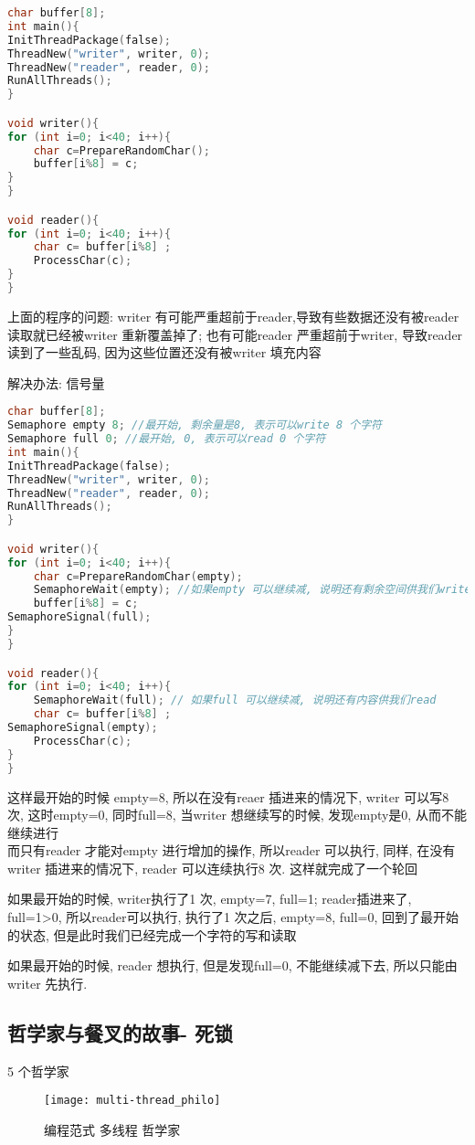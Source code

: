 \documentclass{article}
\begin{document}
\begin{lstlisting}[language = C]
char buffer[8];
int main(){
InitThreadPackage(false);
ThreadNew("writer", writer, 0);
ThreadNew("reader", reader, 0);
RunAllThreads();
}

void writer(){
for (int i=0; i<40; i++){
	char c=PrepareRandomChar();
	buffer[i%8] = c;
}
}

void reader(){
for (int i=0; i<40; i++){
	char c= buffer[i%8] ;
	ProcessChar(c);
}
}
\end{lstlisting}
上面的程序的问题: writer 有可能严重超前于reader,导致有些数据还没有被reader 读取就已经被writer 重新覆盖掉了; 也有可能reader 严重超前于writer, 导致reader 读到了一些乱码, 因为这些位置还没有被writer 填充内容

解决办法: 信号量

\begin{lstlisting}[language = C]
char buffer[8];
Semaphore empty 8; //最开始, 剩余量是8, 表示可以write 8 个字符
Semaphore full 0; //最开始, 0, 表示可以read 0 个字符
int main(){
InitThreadPackage(false);
ThreadNew("writer", writer, 0);
ThreadNew("reader", reader, 0);
RunAllThreads();
}

void writer(){
for (int i=0; i<40; i++){
	char c=PrepareRandomChar(empty);
	SemaphoreWait(empty); //如果empty 可以继续减, 说明还有剩余空间供我们write
	buffer[i%8] = c;
SemaphoreSignal(full);
}
}

void reader(){
for (int i=0; i<40; i++){
	SemaphoreWait(full); // 如果full 可以继续减, 说明还有内容供我们read
	char c= buffer[i%8] ;
SemaphoreSignal(empty);
	ProcessChar(c);
}
}
\end{lstlisting}
这样最开始的时候 empty=8, 所以在没有reaer 插进来的情况下, writer 可以写8 次, 这时empty=0, 同时full=8, 当writer 想继续写的时候, 发现empty是0, 从而不能继续进行\\
而只有reader 才能对empty 进行增加的操作, 所以reader 可以执行, 同样, 在没有writer 插进来的情况下, reader 可以连续执行8 次. 这样就完成了一个轮回

如果最开始的时候, writer执行了1 次, empty=7, full=1; reader插进来了, full=1>0, 所以reader可以执行, 执行了1 次之后, empty=8, full=0, 回到了最开始的状态, 但是此时我们已经完成一个字符的写和读取

如果最开始的时候, reader 想执行, 但是发现full=0, 不能继续减下去, 所以只能由writer 先执行.

\subsection{哲学家与餐叉的故事- 死锁}
5 个哲学家
\begin{figure}[htbp]
	\centering
	\texttt{[image: multi-thread\_philo]}\\
	\caption{编程范式 多线程 哲学家}\label{fig.multi-thread.philo}
\end{figure}
\end{document}
